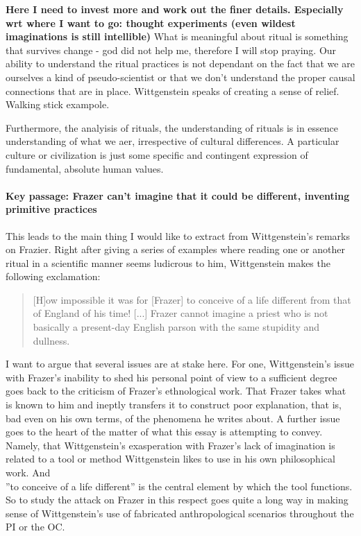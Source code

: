 \documentclass{article}
\begin{document}
\textbf{Here I need to invest more and work out the finer details. Especially wrt where I want to go: thought experiments (even wildest imaginations is still intellible)}
What is meaningful about ritual is something that survives change - god did not help me, therefore I will stop praying. Our ability to understand the ritual practices is not dependant on the fact that we are ourselves a kind of pseudo-scientist or that we don't understand the proper causal connections that are in place. Wittgenstein speaks of creating a sense of relief. Walking stick exampole. 

Furthermore, the analyisis of rituals, the understanding of rituals is in essence understanding of what we aer, irrespective of cultural differences. A particular culture or civilization is just some specific and contingent expression of fundamental, absolute human values.

\paragraph{Key passage: Frazer can't imagine that it could be different, inventing primitive practices}
This leads to the main thing I would like to extract from Wittgenstein's remarks on Frazier. Right after giving a series of examples where reading one or another ritual  in a scientific manner seems ludicrous to him, Wittgenstein makes the following exclamation:
\begin{quote}
[H]ow impossible it was for [Frazer] to conceive of a life different from that of England of his time! [...] Frazer cannot imagine a priest who is not basically a present-day English parson with the same stupidity and dullness.
\end{quote}
I want to argue that several issues are at stake here. For one, Wittgenstein's issue with Frazer's inability to shed his personal point of view to a sufficient degree goes back to the criticism of Frazer's ethnological work. That Frazer takes what is known to him and ineptly transfers it to construct poor explanation, that is, bad even on his own terms, of the phenomena he writes about. A further issue goes to the heart of the matter of what this essay is attempting to convey. Namely, that Wittgenstein's exasperation with Frazer's lack of imagination is related to a tool or method Wittgenstein likes to use in his own philosophical work. And\\
 ''to conceive of a life different'' is the central element by which the tool functions. So to study the attack on Frazer in this respect goes quite a long way in making sense of Wittgenstein's use of fabricated anthropological scenarios throughout the PI or the OC. 
 
\end{document}
